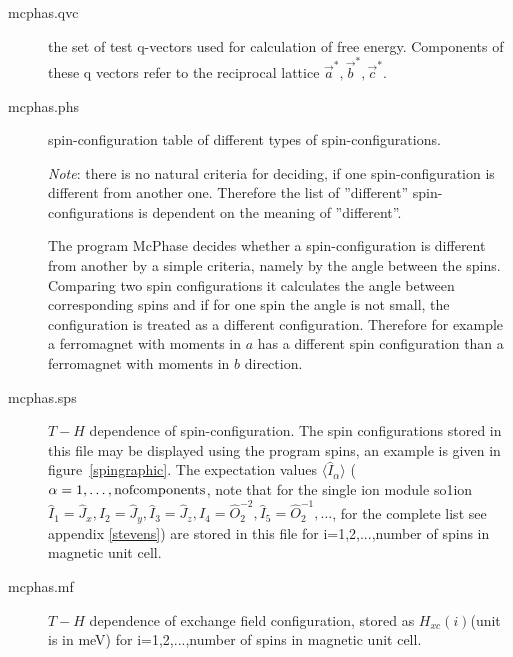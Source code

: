 \begin{description}
\item [\prg mcphas.qvc]    the set of test q-vectors used for calculation of free energy.
                           Components of these q vectors refer to the reciprocal lattice $\vec a^*,\vec b^*,\vec c^*$.
\item [\prg mcphas.phs]    spin-configuration table of different types of spin-configurations. 
                           
                           {\em Note}: 
                           there is no natural criteria for deciding, if one spin-configuration is
			   different from another one. Therefore the list of ''different''
			   spin-configurations is dependent on the meaning of ''different''.
			   
			   The program {\prg McPhase} decides whether a spin-configuration is
			   different from another by a simple criteria, namely by the
			   angle between the spins. Comparing two spin configurations it calculates
			   the angle between corresponding spins and if for one spin the
			   angle is not small, the configuration is treated as a different
			   configuration. Therefore for example a ferromagnet with moments
			   in $a$ has a different spin configuration than a ferromagnet with
			   moments in $b$ direction. 
\item [\prg mcphas.sps]    $T-H$ dependence of spin-configuration. The spin configurations stored in this
                           file may be displayed using the program {\prg spins}, an example is given
			   in figure~\ref{spingraphic}. The expectation values 
                           $\langle \hat I_{\alpha} \rangle$ ($\alpha=1,\dots,{\rm nofcomponents}$, 
                           note that for the single ion module {\prg so1ion} 
                           $\hat I_1=\hat J_x,\hat I_2=\hat J_y,\hat I_3=\hat J_z,\hat I_4=\hat O_2^{-2},\hat I_5=\hat O_2^{-1}, \dots$,
                           for the complete list see appendix \ref{stevens}) are stored in this file  for i=1,2,...,number of spins in magnetic unit cell.
                            

\item [\prg mcphas.mf]     $T-H$ dependence of exchange field configuration, stored as $H_{xc}(i)$(unit is in meV)
                            for i=1,2,...,number of spins in magnetic unit cell.
                           

\end{description}
